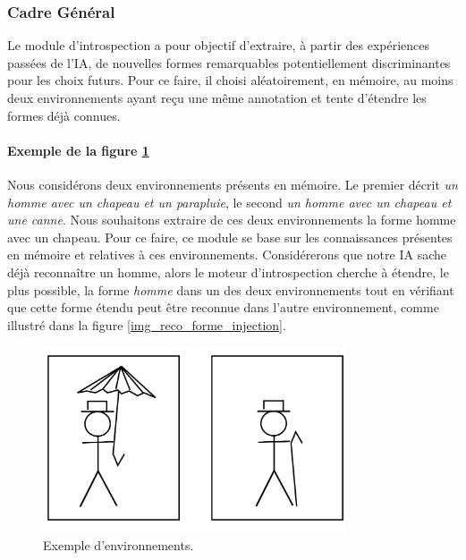\label{subsection_introspection}
\subsubsection{Cadre Général}

Le module d'introspection a pour objectif d'extraire, à partir des expériences passées de l'IA, de nouvelles formes remarquables potentiellement discriminantes pour les choix futurs. Pour ce faire, il choisi aléatoirement, en mémoire, au moins deux environnements ayant reçu une même annotation et tente d'étendre les formes déjà connues.

\paragraph{Exemple de la figure \ref{img_reco_forme_0}}
Nous considérons deux environnements présents en mémoire. Le premier décrit \emph{un homme avec un chapeau et un parapluie}, le second \emph{un homme avec un chapeau et une canne}. Nous souhaitons extraire de ces deux environnements la forme homme avec un chapeau. Pour ce faire, ce module se base sur les connaissances présentes en mémoire et relatives à ces environnements. Considérerons que notre IA sache déjà reconnaître un homme, alors le moteur d'introspection cherche à étendre, le plus possible, la forme \emph{homme} dans un des deux environnements tout en vérifiant que cette forme étendu peut être reconnue dans l'autre environnement, comme illustré dans la figure \ref{img_reco_forme_injection}.

\begin{figure}[H] 
\begin{center}
\includegraphics[width=0.8\textwidth]{files/raisonneur/reconnaissance_de_formes_0} 
\end{center}
\caption{Exemple d'environnements.}
\label{img_reco_forme_0}
\end{figure}

